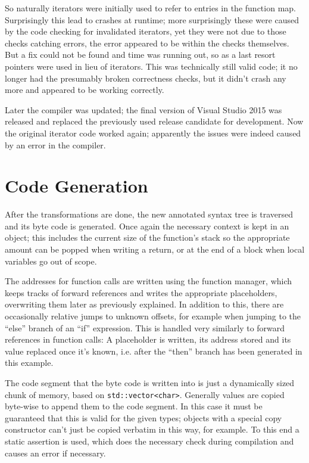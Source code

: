 			So naturally iterators were initially used to refer to entries in the function map. Surprisingly this lead to crashes at runtime; more surprisingly these were caused by the code checking for invalidated iterators, yet they were not due to those checks catching errors, the error appeared to be within the checks themselves. But a fix could not be found and time was running out, so as a last resort pointers were used in lieu of iterators. This was technically still valid code; it no longer had the presumably broken correctness checks, but it didn't crash any more and appeared to be working correctly.
			
			Later the compiler was updated; the final version of Visual Studio 2015 was released and replaced the previously used release candidate for development. Now the original iterator code worked again; apparently the issues were indeed caused by an error in the compiler.
		
	\section{Code Generation}
		
		After the transformations are done, the new annotated syntax tree is traversed and its byte code is generated. Once again the necessary context is kept in an object; this includes the current size of the function's stack so the appropriate amount can be popped when writing a return, or at the end of a block when local variables go out of scope.
		
		The addresses for function calls are written using the function manager, which keeps tracks of forward references and writes the appropriate placeholders, overwriting them later as previously explained. In addition to this, there are occasionally relative jumps to unknown offsets, for example when jumping to the ``else'' branch of an ``if'' expression. This is handled very similarly to forward references in function calls: A placeholder is written, its address stored and its value replaced once it's known, i.e. after the ``then'' branch has been generated in this example.
		
		The code segment that the byte code is written into is just a dynamically sized chunk of memory, based on \lstinline$std::vector<char>$. Generally values are copied byte-wise to append them to the code segment. In this case it must be guaranteed that this is valid for the given types; objects with a special copy constructor can't just be copied verbatim in this way, for example. To this end a static assertion is used, which does the necessary check during compilation and causes an error if necessary.
		
